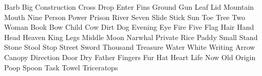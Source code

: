 \documentclass[letterpaper,frontgrid]{flacards}
\begin{document}
 
        {Barb}
        {Big}
        {Construction}
        {Cross}
        {Drop}
        {Enter}
        {Fins}
        {Ground}
        {Gun}
        {Leaf}
        {Lid}
        {Mountain}
        {Mouth}
        {Nine}
        {Person}
        {Power}
        {Prison}
        {River}
        {Seven}
        {Slide}
        {Stick}
        {Sun}
        {Toe}
        {Tree}
        {Two}
        {Woman}
        {Book}
        {Bow}
        {Child}
        {Cow}
        {Dirt}
        {Dog}
        {Evening}
        {Eye}
        {Fire}
        {Five}
        {Flag}
        {Hair}
        {Hand}
        {Head}
        {Heaven}
        {King}
        {Legs}
        {Middle}
        {Moon}
        {Narwhal}
        {Private}
        {Rice Paddy}
        {Small}
        {Stand}
        {Stone}
        {Stool}
        {Stop}
        {Street}
        {Sword}
        {Thousand}
        {Treasure}
        {Water}
        {White}
        {Writing}
        {Arrow}
        {Canopy}
        {Direction}
        {Door}
        {Dry}
        {Father}
        {Fingers}
        {Fur}
        {Hat}
        {Heart}
        {Life}
        {Now}
        {Old}
        {Origin}
        {Poop}
        {Spoon}
        {Task}
        {Towel}
        {Triceratops}
\end{document}

